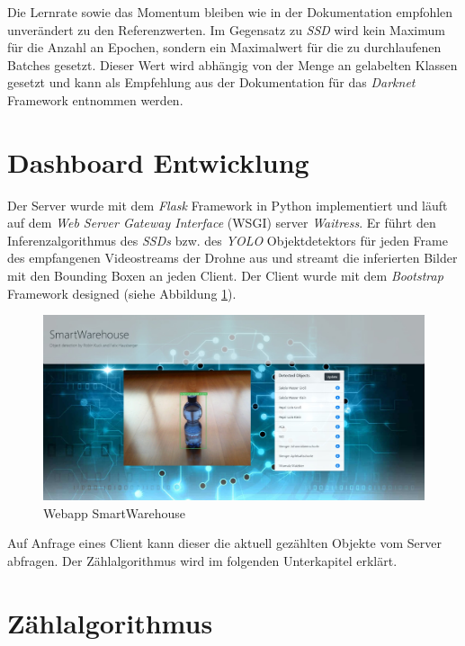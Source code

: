 Die Lernrate sowie das Momentum bleiben wie in der Dokumentation empfohlen unverändert zu den Referenzwerten. Im Gegensatz zu \textit{SSD} wird kein Maximum für die Anzahl an Epochen, sondern ein Maximalwert für die zu durchlaufenen Batches gesetzt. Dieser Wert wird abhängig von der Menge an gelabelten Klassen gesetzt und kann als Empfehlung aus der Dokumentation für das \textit{Darknet} Framework entnommen werden. 

\section{Dashboard Entwicklung}

Der Server wurde mit dem \textit{Flask} Framework in Python implementiert und läuft auf dem \textit{Web Server Gateway Interface} (WSGI) server \textit{Waitress}. Er führt den Inferenzalgorithmus des \textit{SSDs} bzw. des \textit{YOLO} Objektdetektors für jeden Frame des empfangenen Videostreams der Drohne aus und streamt die inferierten Bilder mit den Bounding Boxen an jeden Client. Der Client wurde mit dem \textit{Bootstrap} Framework designed (siehe Abbildung \ref{webapp}).

\begin{figure}[ht]
	\begin{center}
		\includegraphics[width=15cm]{Bilder/webapp.jpeg} 
		\caption[Webapp SmartWarehouse]{Webapp SmartWarehouse}
		\label{webapp}
	\end{center}
\end{figure}

Auf Anfrage eines Client kann dieser die aktuell gezählten Objekte vom Server abfragen. Der Zählalgorithmus wird im folgenden Unterkapitel erklärt. 

\section{Zählalgorithmus}

